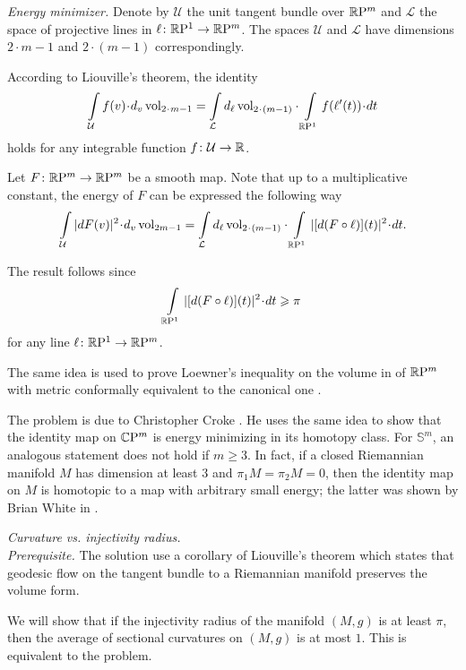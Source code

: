 \textit{Energy minimizer.}
Denote by $\mathcal{U}$ the unit tangent bundle over $\mathbb{R}\mathrm{P}^m$
and $\mathcal{L}$ the space of projective lines in $\ell\colon\mathbb{R}\mathrm{P}^1\to \mathbb{R}\mathrm{P}^m$.
The spaces $\mathcal{U}$ and $\mathcal{L}$ 
have dimensions $2\cdot m-1$ 
and $2\cdot(m-1)$
correspondingly.


According to Liouville's theorem, the identity
\[\int\limits_{\mathcal{U}}f(v)\cdot d_v\vol_{2\cdot m-1}
=
\int\limits_{\mathcal{L}}d_\ell\vol_{2\cdot(m-1)}\cdot\int\limits_{\RP^1} f(\ell'(t))\cdot dt\]
holds for any integrable function $f\colon\mathcal{U}\to\mathbb{R}$.

Let $F\colon\mathbb{R}\mathrm{P}^m\to\mathbb{R}\mathrm{P}^m$ be a smooth map.
Note that up to a multiplicative constant,
the energy of $F$ can be expressed the following way
\[\int\limits_{\mathcal{U}} |dF(v)|^2\cdot d_v\vol_{2m-1}
=
\int\limits_{\mathcal{L}}d_\ell\vol_{2\cdot(m-1)}\cdot\int\limits_{\RP^1} |[d(F\circ \ell)](t)|^2\cdot dt.\]

The result follows since
\[\int\limits_{\RP^1} |[d(F\circ \ell)](t)|^2\cdot dt\ge \pi\]
for any line $\ell\colon\mathbb{R}\mathrm{P}^1\to \mathbb{R}\mathrm{P}^m$.

The same idea is used to prove Loewner's inequality on the volume in of $\mathbb{R}\mathrm{P}^m$ with metric conformally equivalent to the canonical one \cite[see][]{gromov-filling}.

The problem is due to Christopher Croke \cite[see][]{croke-energy}. 
He uses the same idea to show that the identity map on $\mathbb{C}\mathrm{P}^m$ is energy minimizing in its homotopy class.
For $\mathbb S^m$, an analogous statement does not hold if $m\ge 3$.
In fact, 
if a closed Riemannian manifold $M$ 
has dimension at least 3 
and $\pi_1M=\pi_2M=0$,
then the identity map on $M$ is homotopic 
to a map with arbitrary small energy;
the latter was shown by Brian White in \cite{white}.



\textit{Curvature vs. injectivity radius.}\\
\textit{Prerequisite.}
The solution use a corollary of Liouville's theorem 
which states that geodesic flow on the tangent bundle to a Riemannian manifold preserves the volume form.

We will show that 
if the injectivity radius of the manifold $(M,g)$ is at least $\pi$,
then the average of sectional curvatures on $(M,g)$ is at most $1$.
This is equivalent to the problem.

